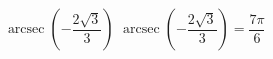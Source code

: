  {$\operatorname{arcsec} \left( -\dfrac{2\sqrt{3}}{3} \right)$}
{ $\operatorname{arcsec} \left( -\dfrac{2\sqrt{3}}{3} \right) = \dfrac{7\pi}{6}$}
